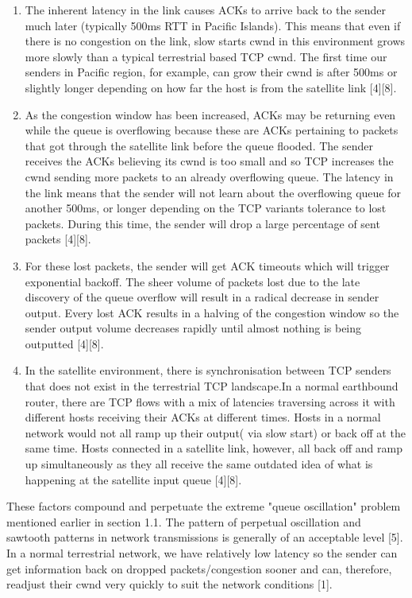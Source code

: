 \documentclass{uathesis}
\begin{document}
\begin{enumerate}
\item The inherent latency in the link causes ACKs to arrive back to the sender much later (typically 500ms RTT in Pacific Islands). This means that even if there is no congestion on the link, slow starts cwnd in this environment grows more slowly than a typical terrestrial based TCP cwnd. The first time our senders in Pacific region, for example, can grow their cwnd is after 500ms or slightly longer depending on how far the host is from the satellite link [4][8]. \\
\item As the congestion window has been increased, ACKs may be returning even while the queue is overflowing because these are ACKs pertaining to packets that got through the satellite link before the queue flooded. The sender receives the ACKs believing its cwnd is too small and so TCP increases the cwnd sending more packets to an already overflowing queue. The latency in the link means that the sender will not learn about the overflowing queue for another 500ms, or longer depending on the TCP variants tolerance to lost packets. During this time, the sender will drop a large percentage of sent packets [4][8].\\
\item For these lost packets, the sender will get ACK timeouts which will trigger exponential backoff. The sheer volume of packets lost due to the late discovery of the queue overflow will result in a radical decrease in sender output. Every lost ACK results in a halving of the congestion window so the sender output volume decreases rapidly until almost nothing is being outputted [4][8].\\
\item  In the satellite environment, there is synchronisation between TCP senders that does not exist in the terrestrial TCP landscape.In a normal earthbound router, there are TCP flows with a mix of latencies traversing across it with different hosts receiving their ACKs at different times. Hosts in a normal network would not all ramp up their output( via slow start) or  back off at the same time. Hosts connected in a satellite link, however, all back off and ramp up simultaneously as they all receive the same outdated idea of what is happening at the satellite input queue [4][8].\\
\end{enumerate}

These factors compound and perpetuate the extreme "queue oscillation" problem mentioned earlier in section 1.1. The pattern of perpetual oscillation and sawtooth patterns in network transmissions is generally of an acceptable level [5]. In a normal terrestrial network, we have relatively low latency so the sender can get information back on dropped packets/congestion sooner and can, therefore, readjust their cwnd very quickly to suit the network conditions [1].\\
\end{document}
